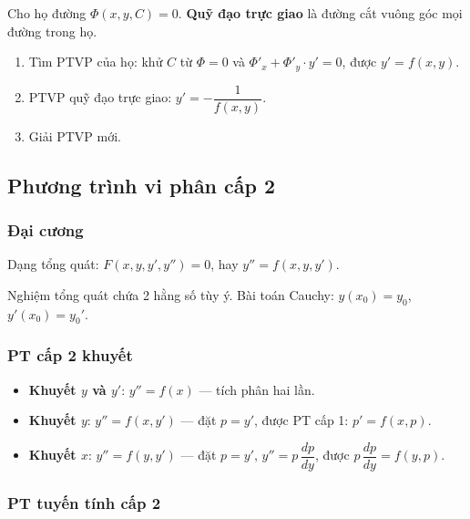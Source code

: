 \documentclass[12pt,a4paper]{article}
\begin{document}
\begin{dinhnghia}
  Cho họ đường $\Phi(x, y, C) = 0$. \textbf{Quỹ đạo trực giao} là đường cắt vuông góc mọi đường trong họ.
\end{dinhnghia}

\begin{phuongphap}
  \begin{enumerate}
    \item Tìm PTVP của họ: khử $C$ từ $\Phi = 0$ và $\Phi'_x + \Phi'_y \cdot y' = 0$, được $y' = f(x,y)$.
    \item PTVP quỹ đạo trực giao: $y' = -\dfrac{1}{f(x,y)}$.
    \item Giải PTVP mới.
  \end{enumerate}
\end{phuongphap}

\subsection{Phương trình vi phân cấp 2}

\subsubsection{Đại cương}

\begin{dinhnghia}
  Dạng tổng quát: $F(x, y, y', y'') = 0$, hay $y'' = f(x, y, y')$.

  Nghiệm tổng quát chứa 2 hằng số tùy ý. Bài toán Cauchy: $y(x_0) = y_0$, $y'(x_0) = y_0'$.
\end{dinhnghia}

\subsubsection{PT cấp 2 khuyết}

\begin{phuongphap}
  \begin{itemize}
    \item \textbf{Khuyết $y$ và $y'$}: $y'' = f(x)$ --- tích phân hai lần.
    \item \textbf{Khuyết $y$}: $y'' = f(x, y')$ --- đặt $p = y'$, được PT cấp 1: $p' = f(x, p)$.
    \item \textbf{Khuyết $x$}: $y'' = f(y, y')$ --- đặt $p = y'$, $y'' = p\,\dfrac{dp}{dy}$, được $p\,\dfrac{dp}{dy} = f(y, p)$.
  \end{itemize}
\end{phuongphap}

\subsubsection{PT tuyến tính cấp 2}
\end{document}
